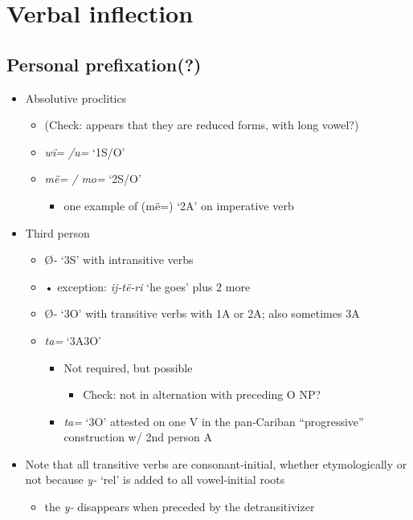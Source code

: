 \documentclass{memoir}
\begin{document}
\chapter{\texorpdfstring{Verbal inflection
\label{verbinfl}}{Verbal inflection }}

\section{Personal prefixation(?)}

\begin{itemize}
\tightlist
\item
  Absolutive proclitics

  \begin{itemize}
  \tightlist
  \item
    (Check: appears that they are reduced forms, with long vowel?)
  \item
    \emph{wï= /u=} `1S/O'
  \item
    \emph{më= / mo=} `2S/O'

    \begin{itemize}
    \tightlist
    \item
      one example of (më=) `2A' on imperative verb
    \end{itemize}
  \end{itemize}
\item
  Third person

  \begin{itemize}
  \tightlist
  \item
    Ø‑ `3S' with intransitive verbs
  \item
    • exception: \emph{ij‑të‑ri} `he goes' plus 2 more
  \item
    Ø‑ `3O' with transitive verbs with 1A or 2A; also sometimes 3A
  \item
    \emph{ta=} `3A3O'

    \begin{itemize}
    \tightlist
    \item
      Not required, but possible

      \begin{itemize}
      \tightlist
      \item
        Check: not in alternation with preceding O NP?
      \end{itemize}
    \item
      \emph{ta=} `3O' attested on one V in the pan‑Cariban
      ``progressive'' construction w/ 2nd person A
    \end{itemize}
  \end{itemize}
\item
  Note that all transitive verbs are consonant‑initial, whether
  etymologically or not because \emph{y‑} `rel' is added to all
  vowel‑initial roots

  \begin{itemize}
  \tightlist
  \item
    the \emph{y‑} disappears when preceded by the detransitivizer
  \end{itemize}
\end{itemize}
\end{document}
